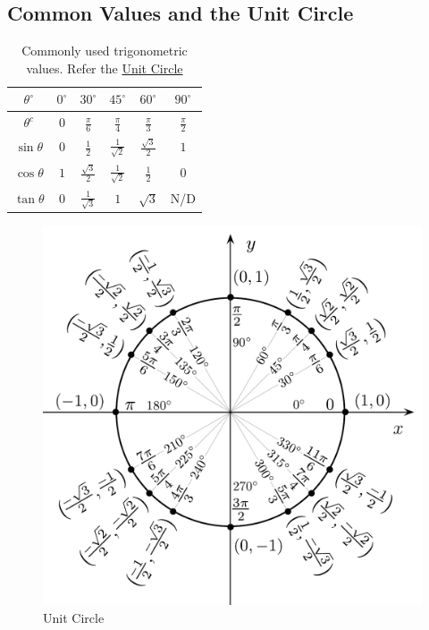 \documentclass[12pt]{article}
\begin{document}
\subsection{Common Values and the Unit Circle}
\begin{table}[H]
	\centering
	\renewcommand{\arraystretch}{1.5}
	\begin{tabular}{cccccc}
		\toprule
		$\theta ^ \circ$ & $0^ \circ$ & $30^ \circ$ & $45^ \circ$ & $60^ \circ$ & $90^ \circ$ \\ \midrule
		$\theta ^ c$ & $0$ & $\frac{\pi}{6}$ & $\frac{\pi}{4}$ & $\frac{\pi}{3}$ & $\frac{\pi}{2}$ \\ \midrule
		$\sin \theta$ & $0$ & $\frac{1}{2}$ & $\frac{1}{\sqrt{2}}$ & $\frac{\sqrt{3}}{2}$ & $1$ \\
		$\cos \theta$ & $1$ & $\frac{\sqrt{3}}{2}$ & $\frac{1}{\sqrt{2}}$ & $\frac{1}{2}$ & $0$ \\
		$\tan \theta$ & 0 & $\frac{1}{\sqrt{3}}$ & $1$ & $\sqrt{3}$ & N/D \\ \bottomrule
	\end{tabular}
	\caption{\label{standardvals}Commonly used trigonometric values. Refer the \hyperref[unitcircle]{Unit Circle}}
\end{table}
\begin{figure}[ht]
	\centering
	\includegraphics[scale=0.8]{figures/Unit_circle_angles.pdf}
	\caption{\label{unitcircle} Unit Circle}
\end{figure}
\end{document}
